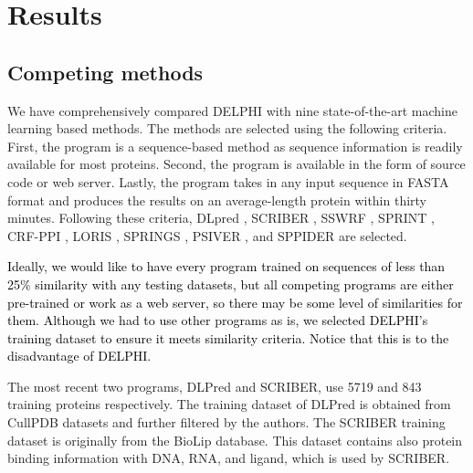 \documentclass{bioinfo}
\newcommand{\myColor}{black}
\begin{document}
\section{Results}
\subsection{Competing methods}
We have comprehensively compared DELPHI with nine state-of-the-art machine learning based methods. The methods are selected using the following criteria. First, the program is a sequence-based method as sequence information is readily available for most proteins. Second, the program is available in the form of source code or web server. Lastly, the program takes in any input sequence in FASTA format and produces the results on an average-length protein within thirty minutes. Following these criteria, DLpred \citep{zhang2019sequence}, SCRIBER \citep{zhang2019scriber}, SSWRF \citep{wei2016protein}, SPRINT \citep{taherzadeh2016sequence}, CRF-PPI \citep{wei2015cascade}, LORIS \citep{dhole2014sequence}, SPRINGS \citep{singh2014springs}, PSIVER \citep{murakami2010applying}, and SPPIDER \citep{porollo2007prediction} are selected.

\textcolor{\myColor}{Ideally, we would like to have every program trained on sequences of less than 25\% similarity with any testing datasets, but all competing programs are either pre-trained or work as a web server, so there may be some level of similarities for them. Although we had to use other programs as is, we selected DELPHI's training dataset to ensure it meets similarity criteria. Notice that this is to the disadvantage of DELPHI.}

 The most recent two programs, DLPred and SCRIBER, use 5719 and 843 training proteins respectively. The training dataset of DLPred is obtained from CullPDB datasets \citep{wang2003pisces} and further filtered by the authors. The SCRIBER training dataset is originally from the BioLip database. This dataset contains also protein binding information with DNA, RNA, and ligand, which is used by SCRIBER.
\end{document}
